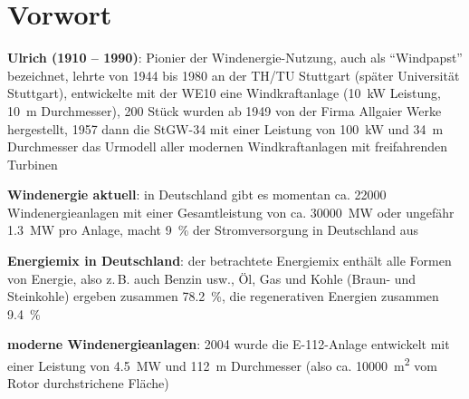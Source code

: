 \section{%
    Vorwort%
}

\textbf{Ulrich  (1910 -- 1990)}:
Pionier der Windenergie-Nutzung,
auch als "`Windpapst"' bezeichnet,
lehrte von 1944 bis 1980 an der TH/TU Stuttgart (später Universität Stuttgart),
entwickelte mit der WE10 eine Windkraftanlage
(\SI{10}{\kilo\watt} Leistung, \SI{10}{\meter} Durchmesser),
200 Stück wurden ab 1949 von der Firma Allgaier Werke hergestellt,
1957 dann die StGW-34 mit einer Leistung von \SI{100}{\kilo\watt}
und \SI{34}{\meter} Durchmesser
das Urmodell aller modernen Windkraftanlagen mit freifahrenden Turbinen

\textbf{Windenergie aktuell}:
in Deutschland gibt es momentan ca. \num{22000} Windenergieanlagen mit einer Gesamtleistung von
ca. \SI{30000}{\mega\watt} oder ungefähr \SI{1.3}{\mega\watt} pro Anlage,
macht \SI{9}{\percent} der Stromversorgung in Deutschland aus

\textbf{Energiemix in Deutschland}:
der betrachtete Energiemix enthält alle Formen von Energie, also z.\,B. auch Benzin usw.,
Öl, Gas und Kohle (Braun- und Steinkohle) ergeben zusammen \SI{78.2}{\percent},
die regenerativen Energien zusammen \SI{9.4}{\percent}

\textbf{moderne Windenergieanlagen}:
2004 wurde die E-112-Anlage entwickelt mit einer Leistung von \SI{4.5}{\mega\watt} und
\SI{112}{\meter} Durchmesser (also ca. \SI{10000}{\square\meter} vom Rotor durchstrichene Fläche)

\pagebreak
